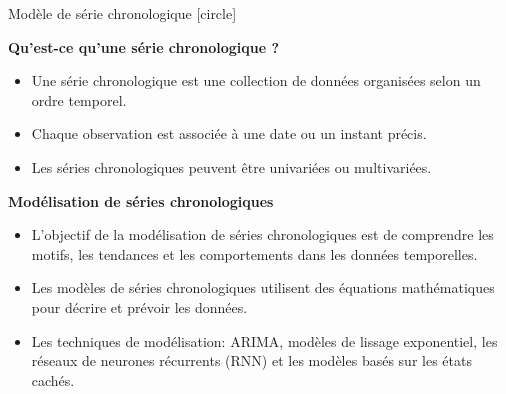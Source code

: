 \documentclass{beamer}
\begin{document}
\begin{frame}[t]{Modèle de série chronologique}
	[circle]
	
	\textbf{Qu'est-ce qu'une série chronologique ?}
	\begin{itemize}
		\item Une série chronologique est une collection de données organisées selon un ordre temporel.
		\item Chaque observation est associée à une date ou un instant précis.
		\item Les séries chronologiques peuvent être univariées  ou multivariées.
	\end{itemize}
	
	\vspace{0.3cm}
	\textbf{Modélisation de séries chronologiques}
	\begin{itemize}
		\item L'objectif de la modélisation de séries chronologiques est de comprendre les motifs, les tendances et les comportements dans les données temporelles.
		\item Les modèles de séries chronologiques utilisent des équations mathématiques pour décrire et prévoir les données.
		\item Les techniques de modélisation: ARIMA, modèles de lissage exponentiel, les réseaux de neurones récurrents (RNN) et les modèles basés sur les états cachés.
	\end{itemize}
\end{frame}
\end{document}
